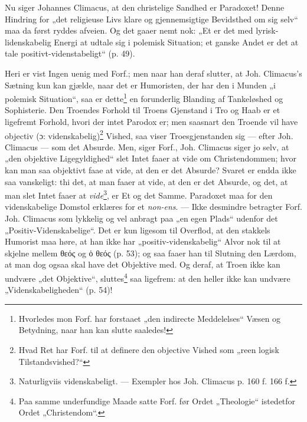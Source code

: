 \documentclass[12pt,a4paper]{book}
\newcommand{\opage}[1]{\marginnote{\footnotesize\textit{[#1]}}}
\begin{document}
Nu siger Johannes Climacus, at den christelige Sandhed
er Paradoxet! Denne Hindring for „det religieuse Livs
klare og gjennemsigtige Bevidsthed om sig selv“ maa da først
ryddes afveien. Og det gaaer nemt nok: „Et er det med
lyrisk-lidenskabelig Energi at udtale sig i polemisk Situation;
et ganske Andet er det at tale positivt-videnstabeligt“ (p. 49).

Heri er vist Ingen uenig med Forf.; men naar han
deraf slutter, at Joh. Climacus's Sætning kun kan gjælde,
naar det er Humoristen, der har den i Munden „i polemisk
Situation“, saa er dette\footnote{Hvorledes mon Forf. har forstaaet „den indirecte Meddelelses“ Væsen og Betydning, naar han kan slutte saaledes!} en forunderlig Blanding af Tankeløshed
og Sophisterie. Den Troendes Forhold til Troens
Gjenstand i Tro og Haab er et ligefremt Forhold, hvori der
intet Parodox er; men saasnart den Troende vil have objectiv
(ɔ: videnskabelig)\footnote{Hvad Ret har Forf. til at definere den objective Vished som „reen logisk Tilstandsvished?“} Vished, saa viser Troesgjenstanden sig
--- efter Joh. Climacus --- som det Absurde. Men, siger
Forf., Joh. Climacus siger jo selv, at „den objektive Ligegyldighed“
slet Intet faaer at vide om Christendommen; hvor
kan man saa objektivt faae at vide, at den er det Absurde?
Svaret er endda ikke saa vanskeligt: thi det, at man faaer at
vide, at den er det Absurde, og det, at man slet Intet faaer
at \emph{vide}\footnote{Naturligviis videnskabeligt. --- Exempler hos Joh. Climacus p. 160 f. 166 f.}, er Et og det Samme. Paradoxet maa for den
videnskabelige Domstol erklæres for et \textit{non-ens}. --- Ikke desmindre
betragter Forf. Joh. Climacus som lykkelig og vel
anbragt paa „en egen Plads“ udenfor det „Positiv-Videnskabelige“.
Det er kun ligesom til Overflod, at den stakkels
\opage{10}\setcounter{footnote}{0}%
Humorist maa høre, at han ikke har „positiv-videnskabelig“
Alvor nok til at skjelne mellem θεός og ὁ θεός (p. 53); og
saa faaer han til Slutning den Lærdom, at man dog ogsaa
skal have det Objektive med. Og deraf, at Troen ikke kan
undvære „det Objektive“, sluttes\footnote{Paa samme underfundige Maade satte Forf. før Ordet „Theologie“ istedetfor Ordet „Christendom“.} saa ligefrem: at den heller
ikke kan undvære „Videnskabeligheden“ (p. 54)!
\end{document}
